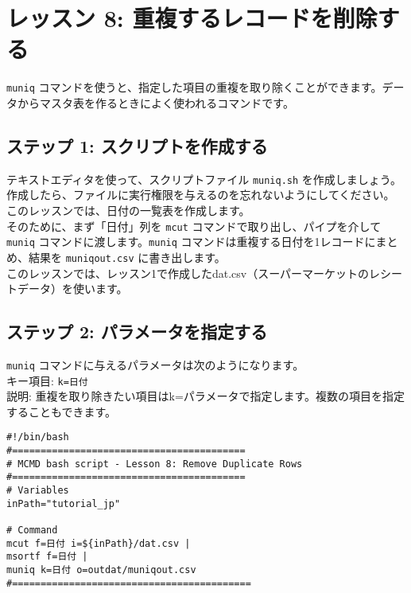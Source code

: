 

%

\section{レッスン 8: 重複するレコードを削除する}

\verb|muniq| コマンドを使うと、指定した項目の重複を取り除くことができます。データからマスタ表を作るときによく使われるコマンドです。

\subsection{ステップ 1: スクリプトを作成する}

テキストエディタを使って、スクリプトファイル \verb|muniq.sh| を作成しましょう。作成したら、ファイルに実行権限を与えるのを忘れないようにしてください。\\

このレッスンでは、日付の一覧表を作成します。\\

そのために、まず「日付」列を \verb|mcut| コマンドで取り出し、パイプを介して \verb|muniq| コマンドに渡します。\verb|muniq| コマンドは重複する日付を1レコードにまとめ、結果を \verb|muniqout.csv| に書き出します。\\

このレッスンでは、レッスン1で作成したdat.csv（スーパーマーケットのレシートデータ）を使います。

\subsection{ステップ 2: パラメータを指定する}

{\setlength{\parindent}{0cm}

\verb|muniq| コマンドに与えるパラメータは次のようになります。\\

キー項目: \verb|k=日付| \\
説明: 重複を取り除きたい項目はk=パラメータで指定します。複数の項目を指定することもできます。
}

\begin{verbatim}
#!/bin/bash
#=========================================
# MCMD bash script - Lesson 8: Remove Duplicate Rows
#=========================================
# Variables
inPath="tutorial_jp"

# Command 
mcut f=日付 i=${inPath}/dat.csv |
msortf f=日付 |   
muniq k=日付 o=outdat/muniqout.csv
#==========================================
\end{verbatim}

